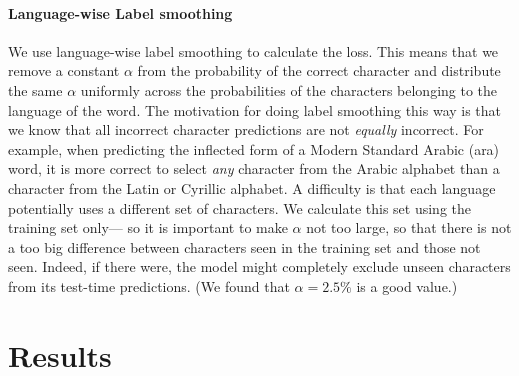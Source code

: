 \documentclass[11pt,a4paper]{article}
\begin{document}
\paragraph{Language-wise Label smoothing} We use language-wise label
smoothing to calculate the loss. This means that we remove a constant $\alpha$
from the probability of the correct character and distribute the same
$\alpha$ uniformly across the probabilities of the characters
belonging to the language of the word. The motivation for doing label
smoothing this way is that we know that all incorrect character
predictions are not \emph{equally} incorrect. For example, when
predicting the inflected form of a Modern Standard Arabic (ara) word,
it is more correct to select \emph{any} character from the Arabic
alphabet than a character from the Latin or Cyrillic alphabet.  A
difficulty is that each language potentially uses a different set of
characters. We calculate this set using the training set only--- so it
is important to make $\alpha$ not too large, so that there is not a
too big difference between characters seen in the training set and
those not seen.  Indeed, if there were, the model might completely
exclude unseen characters from its test-time predictions. (We found
that \(\alpha=2.5\%\) is a good value.)




\section{Results}

\end{document}
